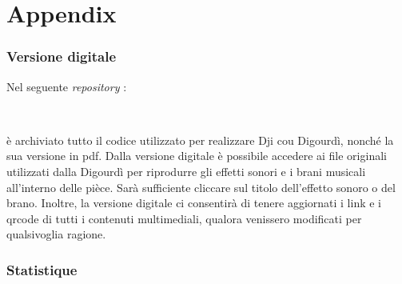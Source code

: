 \documentclass[11pt, twoside, openright]{book}
\begin{document}
\frontmatter

\clearpage
\thispagestyle{empty}



\tableofcontents
\clearpage
\listofvideos
\listofsounds
\listofeffets
\listoffotos




\mainmatter










 


\backmatter
\chapter*{Appendix}
\pagestyle{plain}
\subsection*{Versione digitale}
Nel seguente \textit{repository} :
\begin{center}
\centering
\github\ \hspace*{0.5mm} \href{\detokenize{https://github.com/jbollon/Dji-cou-Digourdi}}{} \hspace*{0.5mm} \github\\
 \vspace*{2mm}
\end{center}
\noindent è archiviato tutto il codice utilizzato per realizzare Dji cou Digourdì, nonché la sua versione in pdf. Dalla versione digitale è possibile accedere ai file originali utilizzati dalla Digourdì per riprodurre gli effetti sonori e i brani musicali all'interno delle pièce. Sarà sufficiente cliccare sul titolo dell'effetto sonoro o del brano.
Inoltre, la versione digitale ci consentirà di  tenere aggiornati i link e i qrcode di tutti i contenuti multimediali, qualora venissero modificati per qualsivoglia ragione.

\subsection*{Statistique}

%


\end{document}
